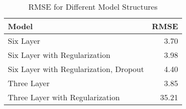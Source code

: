 \begin{table}[ht]
\centering
\caption{RMSE for Different Model Structures} 
\label{tab:model_rmse}
\begin{tabular}{lr}
  \hline
Model & RMSE \\ 
  \hline
Six Layer & 3.70 \\ 
  Six Layer with Regularization & 3.98 \\ 
  Six Layer with Regularization, Dropout & 4.40 \\ 
  Three Layer & 3.85 \\ 
  Three Layer with Regularization & 35.21 \\ 
   \hline
\end{tabular}
\end{table}
